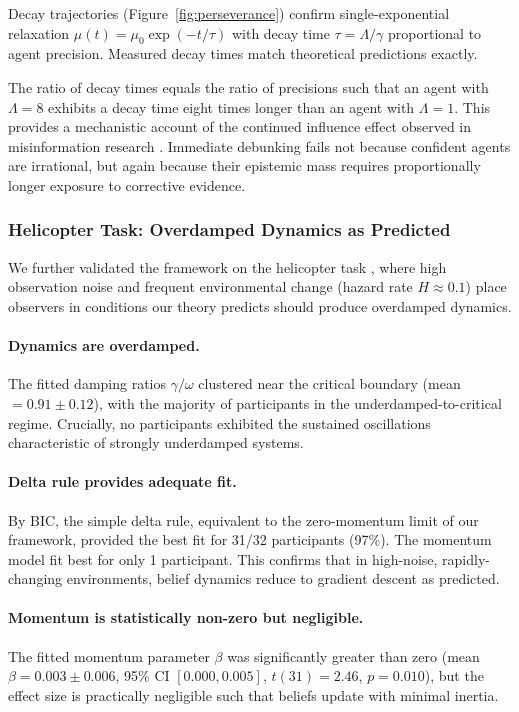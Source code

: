 \documentclass[12pt]{article}
\begin{document}
Decay trajectories (Figure~\ref{fig:perseverance}) confirm single-exponential relaxation $\mu(t) = \mu_0 \exp(-t/\tau)$ with decay time $\tau = \Lambda/\gamma$ proportional to agent precision. Measured decay times match theoretical predictions exactly. 

The ratio of decay times equals the ratio of precisions such that an agent with $\Lambda = 8$ exhibits a decay time eight times longer than an agent with $\Lambda = 1$. This provides a mechanistic account of the continued influence effect observed in misinformation research \citet{Lewandowsky2012}. Immediate debunking fails not because confident agents are irrational, but again because their epistemic mass requires proportionally longer exposure to corrective evidence.


\subsubsection{Helicopter Task: Overdamped Dynamics as Predicted}

We further validated the framework on the helicopter task \citet{mcguire2014}, where high observation noise and frequent environmental change (hazard rate $H \approx 0.1$) place observers in conditions our theory predicts should produce overdamped dynamics.

\paragraph{Dynamics are overdamped.} The fitted damping ratios $\gamma/\omega$ clustered near the critical boundary (mean $= 0.91 \pm 0.12$), with the majority of participants in the underdamped-to-critical regime. Crucially, no participants exhibited the sustained oscillations characteristic of strongly underdamped systems.

\paragraph{Delta rule provides adequate fit.} By BIC, the simple delta rule, equivalent to the zero-momentum limit of our framework, provided the best fit for 31/32 participants (97\%). The momentum model fit best for only 1 participant. This confirms that in high-noise, rapidly-changing environments, belief dynamics reduce to gradient descent as predicted.

\paragraph{Momentum is statistically non-zero but negligible.} The fitted momentum parameter $\beta$ was significantly greater than zero (mean $\beta = 0.003 \pm 0.006$, 95\% CI $[0.000, 0.005]$, $t(31) = 2.46$, $p = 0.010$), but the effect size is practically negligible such that beliefs update with minimal inertia.
\end{document}
